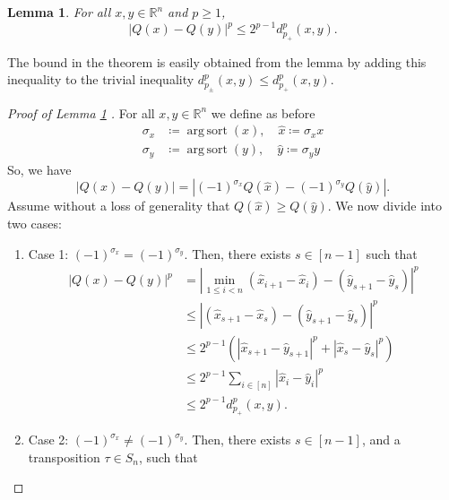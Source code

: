 \documentclass{amsart}
\theoremstyle{plain}
\newtheorem{lemma}{Lemma}
\theoremstyle{definition}
\theoremstyle{remark}
\DeclareMathOperator*{\argsort}{arg\,sort}
\newcommand{\RR}{\mathbb{R}}
\newcommand{\abs}[1]{\left\lvert#1\right\rvert}
\begin{document}
\begin{lemma} \label{lemma:lemma_Q}
    For all $x, y \in \RR^n$  and $p \geq 1$,
    \begin{equation}
        \abs{Q(x) - Q(y)}^p \leq 2^{p - 1}d^p_{p_+}(x, y).
    \end{equation}
\end{lemma}
The bound in the theorem is easily obtained from the lemma by adding this inequality to the trivial inequality  $d^p_{p_\pm}(x, y)\leq d^p_{p_+}(x, y) $.
\begin{proof}[Proof of Lemma \ref{lemma:lemma_Q} ]
    For all $x, y \in \RR^{n}$ we define as before
    \begin{equation} \begin{split}
        \sigma_x &\coloneq \argsort{\left(x \right)}, \quad \hat{x} \coloneq \sigma_x x \\
        \sigma_y &\coloneq \argsort{\left(y \right)}, \quad \hat{y} \coloneq \sigma_y y
    \end{split} \end{equation}
    So, we have
    $$\abs{Q\left(x \right) - Q\left(y \right)} = 
    \abs{(-1)^{\sigma_x} Q(\hat{x}) - (-1)^{\sigma_y}Q(\hat{y})}.
    $$
    Assume without a loss of generality that $Q(\hat{x}) \geq Q(\hat{y})$. We now divide into two cases:
    \begin{enumerate}
        \item Case 1: $(-1)^{\sigma_x} = (-1)^{\sigma_y}$. Then, there exists $s \in [n-1]$ such that 
        \begin{equation}
            \begin{split}
                \abs{Q(x) - Q(y)}^p &= \abs{\min_{1 \leq i < n}{\left(\hat{x}_{i+1} - \hat{x}_i\right)} - \left(\hat{y}_{s+1} - \hat{y}_{s}\right) }^p  \\
                &\leq \abs{\left(\hat{x}_{s+1} - \hat{x}_s\right) - \left(\hat{y}_{s+1} - \hat{y}_s\right)}^p  \\
                &\leq 
                2^{p - 1}\left(\abs{\hat{x}_{s+1} - \hat{y}_{s+1}}^p + \abs{\hat{x}_s - \hat{y}_s}^p \right)  \\
                &\leq 
                2^{p - 1}\sum_{i \in [n]}{\abs{\hat{x}_i - \hat{y}_{i}}}^p  \\
                &\leq 2^{p - 1} d^p_{p_+}(x, y).
            \end{split}
        \end{equation}
        \item Case 2: $(-1)^{\sigma_x} \ne (-1)^{\sigma_y}$. Then, there exists $s \in [n-1]$, and a transposition $\tau \in S_n$, such that

\end{enumerate}
\end{proof}
\end{document}

